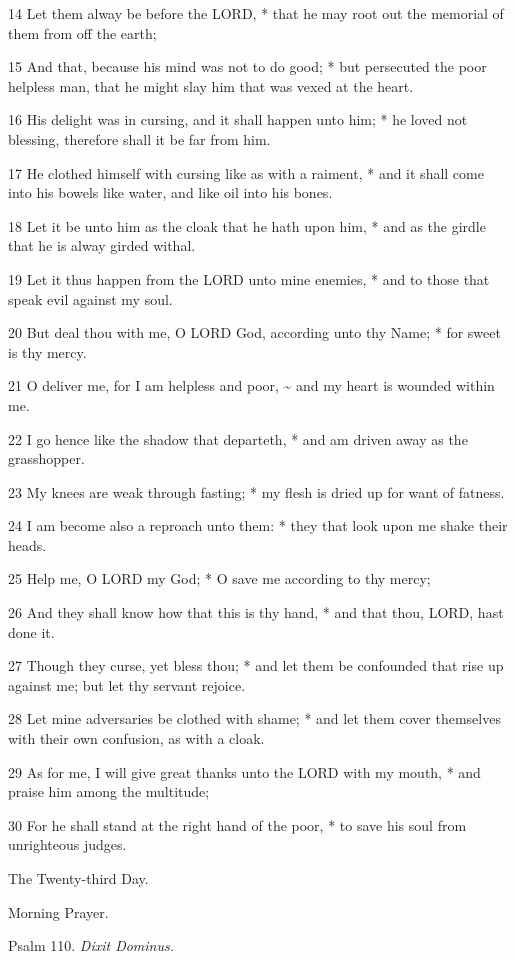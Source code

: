 14 Let them alway be before the LORD, * that he may root
out the memorial of them from off the earth;

15 And that, because his mind was not to do good; * but
persecuted the poor helpless man, that he might slay him that was vexed
at the heart.

16 His delight was in cursing, and it shall happen unto
him; * he loved not blessing, therefore shall it be far from him.

17 He clothed himself with cursing like as with a raiment,
* and it shall come into his bowels like water, and like oil into his bones.

18 Let it be unto him as the cloak that he hath upon
him, * and as the girdle that he is alway girded withal.

19 Let it thus happen from the LORD unto mine enemies,
* and to those that speak evil against my soul.

20 But deal thou with me, O LORD God, according unto thy Name; * for sweet
is thy mercy.

21 O deliver me, for I am helpless and poor, \textasciitilde{} and
my heart is wounded within me.

22 I go hence like the shadow that departeth, * and
am driven away as the grasshopper.

23 My knees are weak through fasting; * my flesh is
dried up for want of fatness.

24 I am become also a reproach unto them: * they that
look upon me shake their heads.

25 Help me, O LORD my God; * O save me according to
thy mercy;

26 And they shall know how that this is thy hand, *
and that thou, LORD, hast done it.

27 Though they curse, yet bless thou; * and let them
be confounded that rise up against me; but let thy servant rejoice.

28 Let mine adversaries be clothed with shame; * and
let them cover themselves with their own confusion, as with a cloak.

29 As for me, I will give great thanks unto the LORD
with my mouth, * and praise him among the multitude;

30 For he shall stand at the right hand of the poor,
* to save his soul from unrighteous judges. 

The
Twenty-third Day.

Morning
Prayer.

Psalm
110. \emph{Dixit Dominus.}

